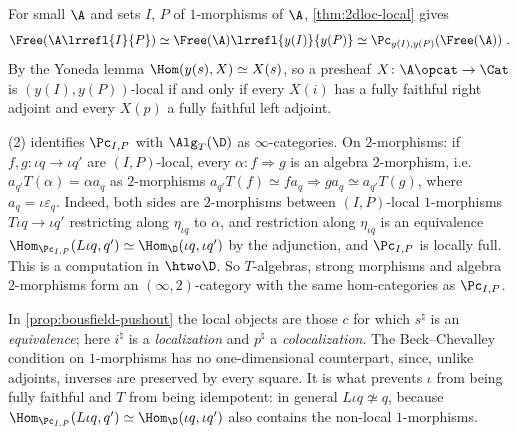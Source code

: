 \begin{rmk}
\label{rmk:free-local}
For small $\A$ and sets $I$, $P$ of $1$-morphisms of $\A$, \cref{thm:2dloc-local} gives
\[
\Free(\A\lrrefl{I}{P}) \simeq \Free(\A)\lrrefl{y(I)}{y(P)} \simeq \Pc_{y(I),y(P)}(\Free(\A)) \ .
\] By the Yoneda lemma $\Hom(y(s),X) \simeq X(s)$, so a presheaf $X\colon \A\opcat \to \Cat$ is $(y(I),y(P))$-local if and only if every $X(i)$ has a fully faithful right adjoint and every $X(p)$ a fully faithful left adjoint.
\end{rmk}

\begin{rmk}
\label{rmk:eilenberg-moore-enriched}
(2) identifies $\Pc_{I,P}$ with $\Alg_{T}(\D)$ as $\infty$-categories. On $2$-morphisms: if $f,g\colon \iota q \to \iota q'$ are $(I,P)$-local, every $\alpha\colon f \Rightarrow g$ is an algebra $2$-morphism, i.e.\ $a_{q'}T(\alpha) = \alpha a_{q}$ as $2$-morphisms $a_{q'}T(f) \simeq fa_{q} \Rightarrow ga_{q} \simeq a_{q'}T(g)$, where $a_{q} = \iota\varepsilon_{q}$. Indeed, both sides are $2$-morphisms between $(I,P)$-local $1$-morphisms $T\iota q \to \iota q'$ restricting along $\eta_{\iota q}$ to $\alpha$, and restriction along $\eta_{\iota q}$ is an equivalence $\Hom_{\Pc_{I,P}}(L\iota q,q') \simeq \Hom_{\D}(\iota q,\iota q')$ by the adjunction, and $\Pc_{I,P}$ is locally full. This is a computation in $\htwo\D$. So $T$-algebras, strong morphisms and algebra $2$-morphisms form an $(\infty,2)$-category with the same hom-categories as $\Pc_{I,P}$.
\end{rmk}

\begin{rmk}
\label{rmk:2dloc-compare-bousfield}
In \cref{prop:bousfield-pushout} the local objects are those $c$ for which $s^{\natural}$ is an \emph{equivalence}; here $i^{\natural}$ is a \emph{localization} and $p^{\natural}$ a \emph{colocalization}.
The Beck--Chevalley condition on $1$-morphisms has no one-dimensional counterpart, since, unlike adjoints, inverses are preserved by every square.
It is what prevents $\iota$ from being fully faithful and $T$ from being idempotent: in general $L\iota q \not\simeq q$, because $\Hom_{\Pc_{I,P}}(L\iota q,q') \simeq \Hom_{\D}(\iota q,\iota q')$ also contains the non-local $1$-morphisms.
\end{rmk}

